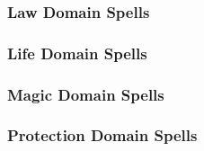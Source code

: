 \begin{spelllist}
    \SLboonofperception[1]
    \SLboonofknowledge[2]
    \SLboonofmastery[3]
    \SLboonofmanyeyes[4]
    \SLboonofprecision[5]
    \SLtrueseeing[6]
    \SLscrybolt[7]
    \SLthirdeye[8]
    \SLrevelation[9]
\end{spelllist}

\subsubsection{Law Domain Spells}

\begin{spelllist}
    \SLprotectionfromalignment[1]
    \SLdiscernlies[2]
    \SLorderswrath[3]
    \SLmarkofscrying[4]
    \SLdictum[5]
    \SLprohibition[6]
    \SLavataroffealty[7]
    \SLimprisonment[8]
    \SLavataroforder[9]
\end{spelllist}

\subsubsection{Life Domain Spells}

\begin{spelllist}
    \SLcurewounds[1]
    \SLsharepain[2]
    \SLrestoration[3]
    \SLavatarofhealing[4]
    \SLrevivify[5]
    \SLheal[6]
    \SLdivineshield[7]
    \SLlifebound[8]
    \SLavataroflife[9]
\end{spelllist}

\subsubsection{Magic Domain Spells}

\begin{spelllist}
    \SLmagicmissile[1]
    \SLdimensionalanchor[2]
    \SLdispelmagic[3]
    \SLmissilestorm[4]
    \SLavatarofmissiles[5]
    \SLspellsight[6]
    \SLantimagicfield[7]
    \SLsevermagic[8]
    \SLdisjoinmagic[9]
\end{spelllist}

\subsubsection{Protection Domain Spells}

\begin{spelllist}
    \SLsanctuary[1]
    \SLsharepain[2]
    \SLresistmagic[3]
    \SLdeathward[4]
    \SLdeflection[5]
    \SLauraofimmunity[6]
    \SLavatarofshielding[7]
    \SLmartyrsgift[8]
    \SLshadowshield[9]
\end{spelllist}

